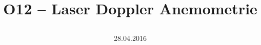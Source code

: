 \title{%
    \textbf{%
        \vspace{50mm} \\ \Huge{O12 -- Laser Doppler Anemometrie}
    } \\
	\date{28.04.2016}
}
